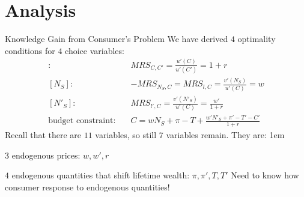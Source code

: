 \documentclass[11pt,aspectratio=43]{beamer}
\let\olditemize=\itemize
\let\endolditemize=\enditemize
\renewenvironment{itemize}{\olditemize \itemsep1em}{\endolditemize}
\theoremstyle{definition}
\begin{document}
\section{Analysis}
\label{sec:Analysis}

\begin{frame}{Knowledge Gain from Consumer's Problem}
\label{slide:Knowledge_Gain_from_Consumer_s_Problem}
    We have derived $ 4 $ optimality conditions for $ 4 $ choice variables:
        \begin{align*}
            [C']: \quad
                & MRS_{C, C'} = \frac{u'( C )}{u'( C' )} = 1+r
            \\
            [ N_{S} ]: \quad
                & -MRS_{N_{S}, C} = MRS_{l, C} = \frac{v'( N_{S} )}{u'( C )} = w
            \\
            [ N'_{S} ]: \quad
                & MRS_{l', C} = \frac{v'( N'_{S} )}{u'( C )} = \frac{w'}{1+r}
            \\
            \text{budget constraint}: \quad
                & C = w N_{S} + \pi - T + \frac{w' N'_{S} + \pi' - T' - C'}{1+r}
        \end{align*}
    Recall that there are $ 11 $ variables, so still $ 7 $ variables remain. They are:
    \begin{itemize}
        \item $ 3 $ endogenous prices: $ w, w', r $
        \item $ 4 $ endogenous quantities that shift lifetime wealth: $ \pi, \pi', T, T' $
    \end{itemize}
    \alert{Need to know how consumer response to endogenous quantities!}
\end{frame}
\end{document}
